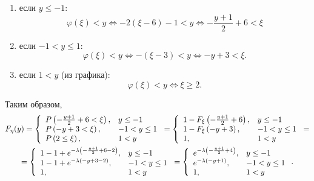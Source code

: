 \documentclass[12pt]{article}
\begin{document}
    \begin{enumerate}
        \item если $y \le -1$:
        \[
            \varphi(\xi) < y
            \Leftrightarrow
            -2 ( \xi - 6 ) - 1 < y
            \Leftrightarrow
            - \frac{y+1}{2} + 6 < \xi
        \]
        \item если $-1 < y \le 1 $:
        \[
            \varphi(\xi) < y
            \Leftrightarrow
            - ( \xi - 3 ) < y
            \Leftrightarrow
            - y + 3 < \xi .
        \]
        \item если $ 1 < y $ (из графика):
        \[
            \varphi(\xi) < y
            \Leftrightarrow
            \xi \ge 2 .
        \]
    \end{enumerate}
    Таким образом,
    \begin{multline*}
        F_\eta(y)
        =
        \left \{
        \begin{array}{ll}
            P \left ( - \frac{y+1}{2} + 6 < \xi \right ), & y \le -1     \\
            P \left ( - y + 3 < \xi \right ),             & -1 < y \le 1 \\
            P \left ( 2 \le \xi \right ),                 & 1 < y
        \end{array}
        \right .
        =
        \left \{
        \begin{array}{ll}
            1 - F_\xi \left ( - \frac{y+1}{2} + 6 \right ), & y \le -1     \\
            1 - F_\xi \left ( - y + 3 \right ),             & -1 < y \le 1 \\
            1,                                              & 1 < y
        \end{array}
        \right .
        = \\
        =
        \left \{
        \begin{array}{ll}
            1 - 1 + e^{ -\lambda \left ( - \frac{y+1}{2} + 6 - 2 \right )}, & y \le -1     \\
            1 - 1 + e^{ -\lambda \left ( - y + 3 - 2 \right )},             & -1 < y \le 1 \\
            1,                                                              & 1 < y
        \end{array}
        \right .
        =
        \left \{
        \begin{array}{ll}
            e^{ -\lambda \left ( - \frac{y+1}{2} + 4 \right )}, & y \le -1     \\
            e^{ -\lambda \left ( - y + 1 \right )},             & -1 < y \le 1 \\
            1,                                                  & 1 < y
        \end{array}
        \right . .
    \end{multline*}
\end{document}
